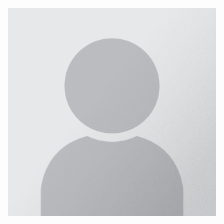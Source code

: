 \documentclass{article}
\newcommand{\imagewidth}{5.5cm}
\newcommand{\imageheight}{5.5cm}
\newcommand{\divider}[4][black]{\color{#1}{\rule[#2]{#3}{#4}}}
\begin{document}
    \begin{minipage}[t][\textheight]{0.3\textwidth}
        \begin{center}
            \includegraphics[width=\imagewidth, height=\imageheight]{Portrait_Placeholder.png}
            \divider[gray]{7pt}{5.5cm}{0.4pt}
        \end{center}
        \vspace{-10pt}
        

\end{minipage}
\end{document}
